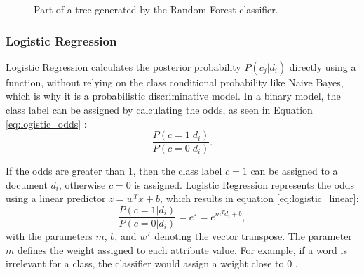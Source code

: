         \begin{figure}
        \centering
    \caption{Part of a tree generated by the Random Forest classifier.}
      \label{fig:tree}
\end{figure}
\subsubsection{Logistic Regression}
\label{sub:logistic}

Logistic Regression calculates the posterior probability $P(c_j|d_i)$ directly using a function, without relying on the class conditional probability like Naive Bayes, which is why it is a probabilistic discriminative model. In a binary model, the class label can be assigned by calculating the odds, as seen in Equation \eqref{eq:logistic_odds} \cite{DBLP:books/aw/TanSKK2019}:
        \begin{equation}
            \label{eq:logistic_odds}
                \frac{P(c=1|d_i)}{P(c=0|d_i)}.
        \end{equation}
        
If the odds are greater than 1, then the class label $c=1$ can be assigned to a document $d_i$, otherwise $c=0$ is assigned. Logistic Regression represents the odds using a linear predictor $z=w^Tx + b$, which results in equation \eqref{eq:logistic_linear}:
        \begin{equation}
            \label{eq:logistic_linear}
                \frac{P(c=1|d_i)}{P(c=0|d_i)} = e^z = e^{m^Td_i+b},
        \end{equation}
with the parameters $m$, $b$, and $w^T$ denoting the vector transpose. The parameter $m$ defines the weight assigned to each attribute value. For example, if a word is irrelevant for a class, the classifier would assign a weight close to 0 \cite{DBLP:books/aw/TanSKK2019}. 

